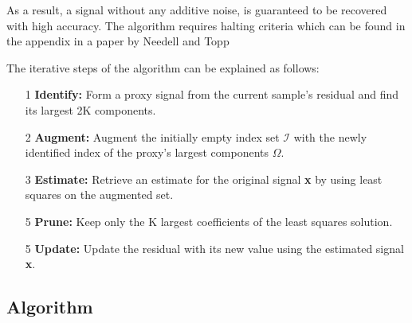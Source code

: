 \documentclass[titlepage,oneside, 12pt]{book}
\theoremstyle{break}
\begin{document}
As a result, a signal without any additive noise, is guaranteed to be recovered with high accuracy. The algorithm requires halting criteria which can be found in the appendix in a paper by Needell and Topp\cite{CoSaMP}

The iterative steps of the algorithm can be explained as follows:

\begin{itemize}
\item[1] \textbf{Identify:} Form a proxy signal from the current sample's residual and find its largest 2K components.  

\item[2] \textbf{Augment:} Augment the initially empty index set $\pmb{\mathcal{I}}$ with the newly identified index of the proxy's largest components $\Omega$. 

\item[3] \textbf{Estimate:} Retrieve an estimate for the original signal \textbf{x} by using least squares on the augmented set. 

\item[5] \textbf{Prune:} Keep only the K largest coefficients of the least squares solution.

\item[5] \textbf{Update:} Update the residual with its new value using the estimated signal \textbf{x}.


\end{itemize}
\newpage
\subsection{Algorithm}
\end{document}
